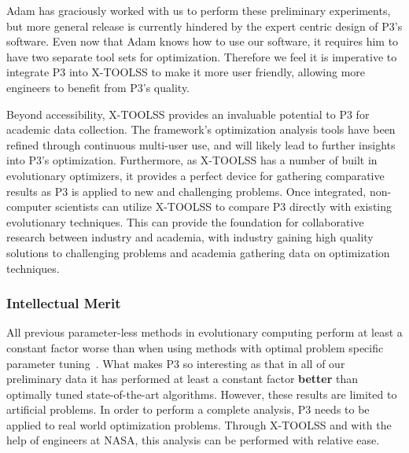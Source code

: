 \documentclass{article}
\newcommand{\includegraphicsfit}[1]
{\texttt{[image: \#1]}}
\begin{document}
Adam has graciously worked with us to perform these preliminary experiments, but more general
release is currently hindered by the expert centric design of P3's software.  Even now that Adam
knows how to use our software, it requires him to have two separate tool sets for optimization.
Therefore we feel it is imperative to integrate P3 into X-TOOLSS to make it more user friendly,
allowing more engineers to benefit from P3's quality.

Beyond accessibility, X-TOOLSS provides an invaluable potential to P3 for academic data collection.
The framework's optimization analysis tools have been refined through continuous multi-user use, and
will likely lead to further insights into P3's optimization.  Furthermore, as X-TOOLSS has a number
of built in evolutionary optimizers, it provides a perfect device for gathering comparative results
as P3 is applied to new and challenging problems.  Once integrated, non-computer scientists can utilize
X-TOOLSS to compare P3 directly with existing evolutionary techniques.  This can provide the foundation
for collaborative research between industry and academia, with industry gaining high quality solutions
to challenging problems and academia gathering data on optimization techniques.




\subsubsection*{Intellectual Merit}

All previous parameter-less methods in evolutionary computing perform at least a constant factor
worse than when using methods with optimal problem specific parameter tuning~\cite{pelikan:2004:parameterlesshboa}.
What makes P3 so interesting as that in all of our preliminary data it has performed at
least a constant factor \textbf{better} than optimally tuned state-of-the-art algorithms.
However, these results are limited to artificial problems.  In order to perform a complete analysis,
P3 needs to be applied to real world optimization problems.  Through X-TOOLSS and 
with the help of engineers at NASA, this
analysis can be performed with relative ease.
\end{document}
